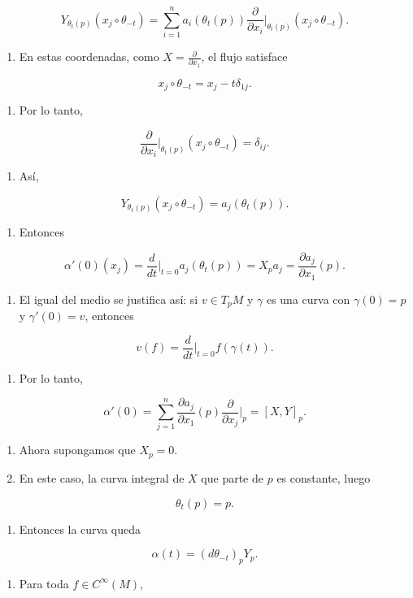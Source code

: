 \begin{bookproof}{}
\[
Y_{\theta_t(p)}(x_j\circ\theta_{-t})=\sum_{i=1}^n a_i(\theta_t(p))\frac{\partial}{\partial x_i}\bigg|_{\theta_t(p)}(x_j\circ\theta_{-t}).
\]
\begin{enumerate}[start=23]
\item En estas coordenadas, como $X=\frac{\partial}{\partial x_1}$, el flujo satisface
\end{enumerate}
\[
x_j\circ\theta_{-t}=x_j-t\delta_{1j}.
\]
\begin{enumerate}[start=24]
\item Por lo tanto,
\end{enumerate}
\[
\frac{\partial}{\partial x_i}\bigg|_{\theta_t(p)}(x_j\circ\theta_{-t})=\delta_{ij}.
\]
\begin{enumerate}[start=25]
\item Así,
\end{enumerate}
\[
Y_{\theta_t(p)}(x_j\circ\theta_{-t})=a_j(\theta_t(p)).
\]
\begin{enumerate}[start=26]
\item Entonces
\end{enumerate}
\[
\alpha'(0)(x_j)=\frac{d}{dt}\bigg|_{t=0}a_j(\theta_t(p))=X_pa_j=\frac{\partial a_j}{\partial x_1}(p).
\]
\begin{enumerate}[start=27]
\item El igual del medio se justifica así: si $v\in T_pM$ y $\gamma$ es una curva con $\gamma(0)=p$ y $\gamma'(0)=v$, entonces
\end{enumerate}
\[
v(f)=\frac{d}{dt}\bigg|_{t=0}f(\gamma(t)).
\]
\begin{enumerate}[start=28]
\item Por lo tanto,
\end{enumerate}
\[
\alpha'(0)=\sum_{j=1}^n \frac{\partial a_j}{\partial x_1}(p)\frac{\partial}{\partial x_j}\bigg|_p=[X,Y]_p.
\]
\begin{enumerate}[start=29]
\item Ahora supongamos que $X_p=0$.
\item En este caso, la curva integral de $X$ que parte de $p$ es constante, luego
\end{enumerate}
\[
\theta_t(p)=p.
\]
\begin{enumerate}[start=31]
\item Entonces la curva queda
\end{enumerate}
\[
\alpha(t)=(d\theta_{-t})_pY_p.
\]
\begin{enumerate}[start=32]
\item Para toda $f\in C^\infty(M)$,
\end{enumerate}

\end{bookproof}
